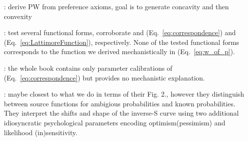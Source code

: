 \documentclass[a4paper, 12pt]{article}
\newcommand{\eref}[1]{(Eq.~\ref{eq:#1})}
\newcommand{\OP}[1]{{\it ***OP: #1 OP***}}
\begin{document}
\cite{WuGonzalez1996,Prelec1998}: derive PW from preference axioms, goal is to generate concavity and then convexity

\cite{Stott2006}: test several functional forms, corroborate \cite{Prelec1998} and \eref{correspondence} and \eref{LattimoreFunction}, respectively. None of the tested functional forms corresponds to the function we derived mechanistically in \eref{w_of_p}. 

\cite{Wakker2010}: the whole book contains only parameter calibrations of \eref{correspondence} but provides no mechanistic explanation.

\cite{AbdellaouiETAL2011}: maybe closest to what we do in terms of their Fig. 2., however they distinguish between source functions for ambigious probabilities and known probabilities. They interpret the shifts and shape of the inverse-S curve using two additional idiosyncratic psychological parameters encoding optimism(pessimism) and likelihood (in)sensitivity. 

\end{document}
